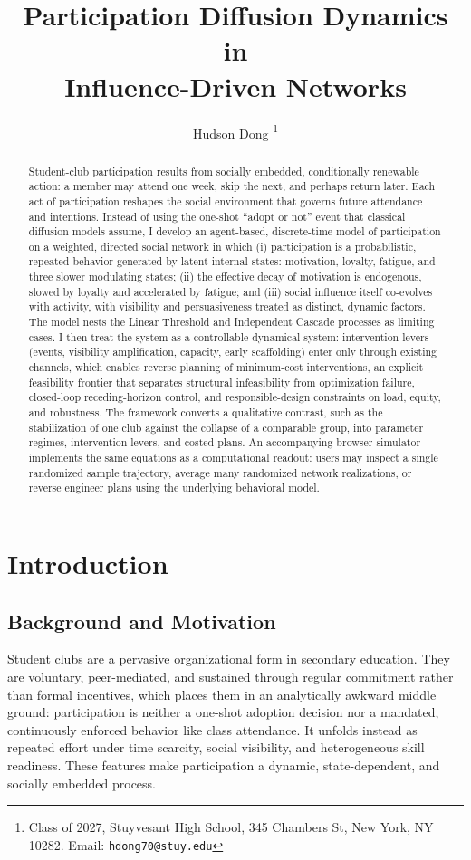 \documentclass[11pt]{article}
\title{\textbf{Participation Diffusion Dynamics in\\ Influence-Driven Networks}}
\author{Hudson Dong \thanks{Class of 2027, Stuyvesant High School, 345 Chambers St, New York, NY 10282. Email: \texttt{hdong70@stuy.edu}}}
\date{}
\begin{document}
\maketitle

\begin{abstract}
\noindent
Student-club participation results from socially embedded, conditionally renewable action: a member may attend one week, skip the next, and perhaps return later. Each act of participation reshapes the social environment that governs future attendance and intentions. Instead of using the one-shot ``adopt or not'' event that classical diffusion models assume, I develop an agent-based, discrete-time model of participation on a weighted, directed social network in which (i) participation is a probabilistic, repeated behavior generated by latent internal states: motivation, loyalty, fatigue, and three slower modulating states; (ii) the effective decay of motivation is endogenous, slowed by loyalty and accelerated by fatigue; and (iii) social influence itself co-evolves with activity, with visibility and persuasiveness treated as distinct, dynamic factors. The model nests the Linear Threshold and Independent Cascade processes as limiting cases. I then treat the system as a controllable dynamical system: intervention levers (events, visibility amplification, capacity, early scaffolding) enter only through existing channels, which enables reverse planning of minimum-cost interventions, an explicit feasibility frontier that separates structural infeasibility from optimization failure, closed-loop receding-horizon control, and responsible-design constraints on load, equity, and robustness. The framework converts a qualitative contrast, such as the stabilization of one club against the collapse of a comparable group, into parameter regimes, intervention levers, and costed plans. An accompanying browser simulator implements the same equations as a computational readout: users may inspect a single randomized sample trajectory, average many randomized network realizations, or reverse engineer plans using the underlying behavioral model.
\end{abstract}

\section{Introduction}

\subsection{Background and Motivation}
Student clubs are a pervasive organizational form in secondary education. They are voluntary, peer-mediated, and sustained through regular commitment rather than formal incentives, which places them in an analytically awkward middle ground: participation is neither a one-shot adoption decision nor a mandated, continuously enforced behavior like class attendance. It unfolds instead as repeated effort under time scarcity, social visibility, and heterogeneous skill readiness. These features make participation a dynamic, state-dependent, and socially embedded process.
\end{document}
